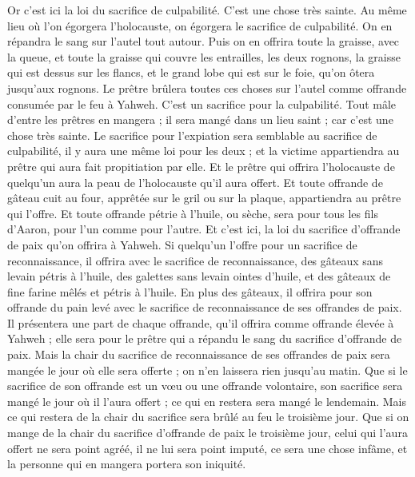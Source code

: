 \begin{multicols}{2}
\VerseOne{}Or c'est ici la loi du sacrifice de culpabilité. C'est une chose très sainte.
Au même lieu où l'on égorgera l'holocauste, on égorgera le sacrifice de culpabilité. On en répandra le sang sur l'autel tout autour.
Puis on en offrira toute la graisse, avec la queue, et toute la graisse qui couvre les entrailles,
les deux rognons, la graisse qui est dessus sur les flancs, et le grand lobe qui est sur le foie, qu'on ôtera jusqu'aux rognons.
Le prêtre brûlera toutes ces choses sur l'autel comme offrande consumée par le feu à Yahweh. C'est un sacrifice pour la culpabilité.
Tout mâle d'entre les prêtres en mangera ; il sera mangé dans un lieu saint ; car c'est une chose très sainte.
Le sacrifice pour l'expiation sera semblable au sacrifice de culpabilité, il y aura une même loi pour les deux ; et la victime appartiendra au prêtre qui aura fait propitiation par elle.
Et le prêtre qui offrira l'holocauste de quelqu'un aura la peau de l'holocauste qu'il aura offert.
Et toute offrande de gâteau cuit au four, apprêtée sur le gril ou sur la plaque, appartiendra au prêtre qui l'offre.
Et toute offrande pétrie à l'huile, ou sèche, sera pour tous les fils d'Aaron, pour l'un comme pour l'autre.
Et c'est ici, la loi du sacrifice d'offrande de paix qu'on offrira à Yahweh.
Si quelqu'un l'offre pour un sacrifice de reconnaissance, il offrira avec le sacrifice de reconnaissance, des gâteaux sans levain pétris à l'huile, des galettes sans levain ointes d'huile, et des gâteaux de fine farine mêlés et pétris à l'huile.
En plus des gâteaux, il offrira pour son offrande du pain levé avec le sacrifice de reconnaissance de ses offrandes de paix.
Il présentera une part de chaque offrande, qu'il offrira comme offrande élevée à Yahweh ; elle sera pour le prêtre qui a répandu le sang du sacrifice d'offrande de paix.
Mais la chair du sacrifice de reconnaissance de ses offrandes de paix sera mangée le jour où elle sera offerte ; on n'en laissera rien jusqu'au matin.
Que si le sacrifice de son offrande est un vœu ou une offrande volontaire, son sacrifice sera mangé le jour où il l'aura offert ; ce qui en restera sera mangé le lendemain.
Mais ce qui restera de la chair du sacrifice sera brûlé au feu le troisième jour.
Que si on mange de la chair du sacrifice d'offrande de paix le troisième jour, celui qui l'aura offert ne sera point agréé, il ne lui sera point imputé, ce sera une chose infâme, et la personne qui en mangera portera son iniquité.

\end{multicols}
